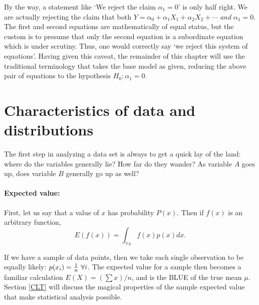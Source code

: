 By the way, a statement like `We reject
the claim $\alpha_1=0$' is only half right. We are actually rejecting
the claim that both
$Y = \alpha_0 + \alpha_1 X_1 + \alpha_2 X_2 + \cdots$ {\em and}
$\alpha_1=0$. 
The first and second equations are mathematically of equal
status, but the custom is to presume that only the second equation is a
subordinate equation which is under scrutiny. Thus, one would correctly
say `we reject this system of equations'. Having given this caveat, the
remainder of this chapter will use the traditional terminology that
takes the base model as given, reducing
the above pair of equations to the hypothesis $H_0: \alpha_1=0$.



\section{Characteristics of data and distributions}\label{basicstats}
The first step in analyzing a data set is always to get a quick lay of
the land: where do the variables generally lie? How far do they wander?
As variable $A$ goes up, does variable $B$ generally go up as well?

\paragraph{Expected value:} 
First, let us say that a value of $x$ has probability $P(x)$. Then
if $f(x)$ is an arbitrary function, 
$$E\left(f(x)\right)=\int_{\forall x} f(x)p(x) dx.$$

If we have a sample of data points, then we take each single observation
to be equally likely: $p(x_i)={1\over n}\ \forall i$.
The expected value for a sample then becomes a familiar calculation
$E(X)=(\sum x)/n$, and is the BLUE of
the true mean $\mu$. Section \ref{CLT} will discuss the magical properties of the
sample expected value that make statistical analysis possible.

